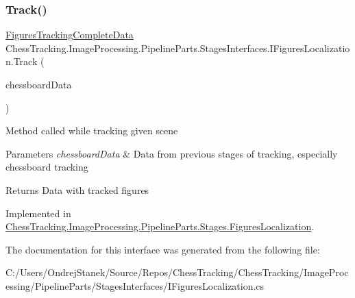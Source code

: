 \subsubsection{\texorpdfstring{Track()}{Track()}}
{\footnotesize\ttfamily \mbox{\hyperlink{class_chess_tracking_1_1_image_processing_1_1_pipeline_data_1_1_figures_tracking_complete_data}{Figures\+Tracking\+Complete\+Data}} Chess\+Tracking.\+Image\+Processing.\+Pipeline\+Parts.\+Stages\+Interfaces.\+I\+Figures\+Localization.\+Track (\begin{DoxyParamCaption}\item[{\mbox{\hyperlink{class_chess_tracking_1_1_image_processing_1_1_pipeline_data_1_1_chessboard_tracking_complete_data}{Chessboard\+Tracking\+Complete\+Data}}}]{chessboard\+Data }\end{DoxyParamCaption})}



Method called while tracking given scene 


\begin{DoxyParams}{Parameters}
{\em chessboard\+Data} & Data from previous stages of tracking, especially chessboard tracking\\
\hline
\end{DoxyParams}
\begin{DoxyReturn}{Returns}
Data with tracked figures
\end{DoxyReturn}


Implemented in \mbox{\hyperlink{class_chess_tracking_1_1_image_processing_1_1_pipeline_parts_1_1_stages_1_1_figures_localization_a1ec6c1018b9ea05d0ec29f66692f8def}{Chess\+Tracking.\+Image\+Processing.\+Pipeline\+Parts.\+Stages.\+Figures\+Localization}}.



The documentation for this interface was generated from the following file\+:\begin{DoxyCompactItemize}
\item 
C\+:/\+Users/\+Ondrej\+Stanek/\+Source/\+Repos/\+Chess\+Tracking/\+Chess\+Tracking/\+Image\+Processing/\+Pipeline\+Parts/\+Stages\+Interfaces/I\+Figures\+Localization.\+cs\end{DoxyCompactItemize}
